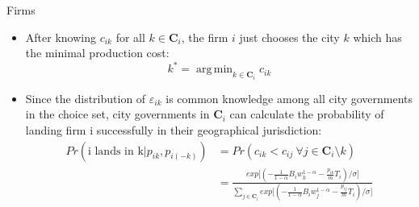\documentclass[xcolor={dvipsnames}]{beamer}
\theoremstyle{plain}
\DeclareMathOperator*{\argmin}{arg\,min}
\begin{document}
\begin{frame}{Firms}
    \begin{itemize}
        \item After knowing $c_{ik}$ for all $k \in \mathbf{C}_i$, the firm $i$ just chooses the city $k$
              which has the minimal production cost:
              $$k^{*} = \argmin_{k \in \mathbf{C}_i} c_{ik}$$
        \item Since the distribution of $\varepsilon_{ik}$ is common knowledge among all city governments in
              the choice set, city governments in $\mathbf{C}_i$ can calculate the probability of landing
              firm i successfully in their geographical jurisdiction:
              \begin{align}
                  Pr(\text{i lands in k}|p_{ik}, p_{i(-k)}) & = Pr(c_{ik} < c_{ij} ~\forall j
                  \in \mathbf{C}_i \setminus k)                                               \\
                                                            & =
                  \frac{exp\big[(-\frac{1}{1-\alpha} B_i w_k^{1-\alpha}
                  - \frac{p_{ik}}{m}T_i)/\sigma\big]}
                  {\sum_{j\in \mathbf{C}_i} exp\big[(-\frac{1}{1-\alpha} B_i w_j^{1-\alpha}
                  - \frac{p_{ij}}{m} T_i)/\sigma\big]}\nonumber     \label{logit prob}
              \end{align}
    \end{itemize}
\end{frame}
\end{document}

